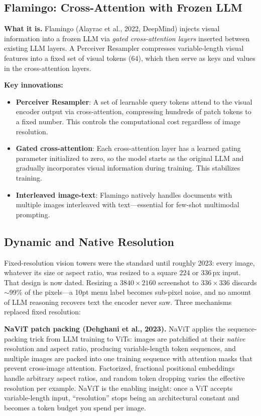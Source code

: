 \subsection{Flamingo: Cross-Attention with Frozen LLM}

\textbf{What it is.} Flamingo (Alayrac et al., 2022, DeepMind) injects visual information into a frozen LLM via \textit{gated cross-attention layers} inserted between existing LLM layers. A Perceiver Resampler compresses variable-length visual features into a fixed set of visual tokens (64), which then serve as keys and values in the cross-attention layers.

\textbf{Key innovations:}
\begin{itemize}
    \item \textbf{Perceiver Resampler}: A set of learnable query tokens attend to the visual encoder output via cross-attention, compressing hundreds of patch tokens to a fixed number. This controls the computational cost regardless of image resolution.
    \item \textbf{Gated cross-attention}: Each cross-attention layer has a learned gating parameter initialized to zero, so the model starts as the original LLM and gradually incorporates visual information during training. This stabilizes training.
    \item \textbf{Interleaved image-text}: Flamingo natively handles documents with multiple images interleaved with text---essential for few-shot multimodal prompting.
\end{itemize}

\subsection{Dynamic and Native Resolution}
\label{subsec:dynamic_resolution}

Fixed-resolution vision towers were the standard until roughly 2023: every image, whatever its size or aspect ratio, was resized to a square $224$ or $336$\,px input. That design is now dated. Resizing a $3840 \times 2160$ screenshot to $336 \times 336$ discards $\sim$99\% of the pixels---a 10pt menu label becomes sub-pixel noise, and no amount of LLM reasoning recovers text the encoder never saw. Three mechanisms replaced fixed resolution:

\textbf{NaViT patch packing (Dehghani et al., 2023).} NaViT applies the sequence-packing trick from LLM training to ViTs: images are patchified at their \textit{native} resolution and aspect ratio, producing variable-length token sequences, and multiple images are packed into one training sequence with attention masks that prevent cross-image attention. Factorized, fractional positional embeddings handle arbitrary aspect ratios, and random token dropping varies the effective resolution per example. NaViT is the enabling insight: once a ViT accepts variable-length input, ``resolution'' stops being an architectural constant and becomes a token budget you spend per image.

